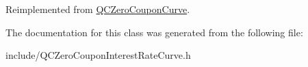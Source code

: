 Reimplemented from \hyperlink{class_q_c_zero_coupon_curve_a83289d8e7ef3cacdc407820b715d9b19}{Q\+C\+Zero\+Coupon\+Curve}.



The documentation for this class was generated from the following file\+:\begin{DoxyCompactItemize}
\item 
include/Q\+C\+Zero\+Coupon\+Interest\+Rate\+Curve.\+h\end{DoxyCompactItemize}
